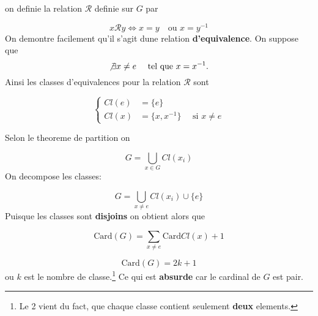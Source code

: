 \documentclass{report}
\begin{document}
\begin{myproof}
  on definie la relation $\mathcal{R}$ definie sur $G$ par

  $$
  x \mathcal{R} y \iff x = y \quad \text {ou } x = y^{-1}
  $$
  On demontre facilement qu'il s'agit dune relation \textbf{d'equivalence}.
  On suppose que 
  $$
  \not \exists x \ne e \quad \text{ tel que } x = x^{-1}.
  $$
  Ainsi les classes d'equivalences pour la relation $\mathcal{R}$ sont

  $$
  \begin{cases}
    Cl(e) &= \{e\}\\
    Cl(x) &= \{x, x^{-1}\} \quad  \text{ si } x\ne e
  \end{cases}
  $$

  Selon le theoreme de partition  on 

  $$
  G = \bigcup_{x\in G} Cl(x_i) 
  $$
  On decompose les classes:

  $$
  G = \bigcup_{x\ne e} Cl(x_i) \cup \{e\}
  $$
  Puisque les classes sont \textbf{disjoins} on obtient alors que

  $$
  \text{Card}(G) = \sum_{x\ne e} \text{Card}Cl(x) + 1
  $$

  $$
  \text{Card}(G) = 2k + 1
  $$
  ou $k$ est le nombre de classe.\footnote{
    Le 2 vient du fact, que chaque classe contient seulement \textbf{deux} elements.
  }
  Ce qui est \textbf{absurde} car le cardinal de $G$ est pair.
\end{myproof}

\newpage
\end{document}
